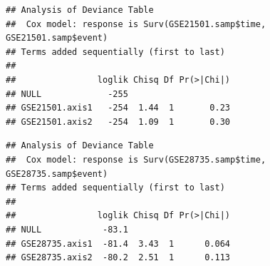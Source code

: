 \documentclass{article}
\begin{document}
\begin{knitrout}
\begin{kframe}
\begin{verbatim}
## Analysis of Deviance Table
##  Cox model: response is Surv(GSE21501.samp$time, GSE21501.samp$event)
## Terms added sequentially (first to last)
## 
##                loglik Chisq Df Pr(>|Chi|)
## NULL             -255                    
## GSE21501.axis1   -254  1.44  1       0.23
## GSE21501.axis2   -254  1.09  1       0.30
\end{verbatim}
\begin{alltt}
\hlstd{(}\hlstd{(}\hlopt{$}\hlopt{$} \hlopt{~}  \hlopt{+} 
\end{alltt}
\begin{verbatim}
## Analysis of Deviance Table
##  Cox model: response is Surv(GSE28735.samp$time, GSE28735.samp$event)
## Terms added sequentially (first to last)
## 
##                loglik Chisq Df Pr(>|Chi|)
## NULL            -83.1                    
## GSE28735.axis1  -81.4  3.43  1      0.064
## GSE28735.axis2  -80.2  2.51  1      0.113
\end{verbatim}
\end{kframe}
\end{knitrout}
\end{document}
